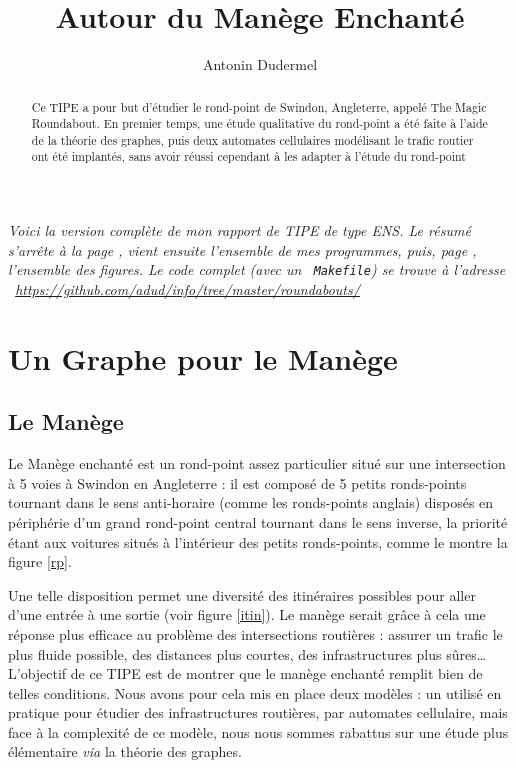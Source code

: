 \documentclass[11pt]{article}
\title{Autour du Manège Enchanté}
\date{}
\author{Antonin Dudermel}
\begin{document}

\maketitle

{\it \small
Voici la version complète de mon rapport de TIPE de type ENS.  Le résumé s'arrête à la page \pageref{finres}, vient ensuite l'ensemble de mes programmes, puis, page \pageref{figs}, l'ensemble des figures. Le code complet (avec un ~\verb+Makefile+) se trouve à l'adresse ~\url{https://github.com/adud/info/tree/master/roundabouts/}}

\begin{abstract}
	Ce TIPE a pour but d'étudier le rond-point de Swindon, Angleterre, appelé The Magic Roundabout. En premier temps, une étude qualitative du rond-point a été faite à l'aide de la théorie des graphes, puis deux automates cellulaires modélisant le trafic routier ont été implantés, sans avoir réussi cependant à les adapter à l'étude du rond-point

\end{abstract}

\section{Un Graphe pour le Manège}
	\subsection{Le Manège}
	
Le Manège enchanté est un rond-point assez particulier situé sur une intersection à 5 voies à Swindon en Angleterre : il est composé de 5 petits ronds-points tournant dans le sens anti-horaire (comme les ronds-points anglais) disposés en périphérie d'un grand rond-point central tournant dans le sens inverse, la priorité étant aux voitures situés à l'intérieur des petits ronds-points, comme le montre la figure \ref{rp}.

Une telle disposition permet une diversité des itinéraires possibles pour aller d'une entrée à une sortie (voir figure \ref{itin}). Le manège serait grâce à cela une réponse plus efficace au problème des intersections routières : assurer un trafic le plus fluide possible, des distances plus courtes, des infrastructures plus sûres… L'objectif de ce TIPE est de montrer que le manège enchanté remplit bien de telles conditions. Nous avons pour cela mis en place deux modèles : un utilisé en pratique pour étudier des infrastructures routières, par automates cellulaire, mais face à la complexité de ce modèle, nous nous sommes rabattus sur une étude plus élémentaire {\it via} la théorie des graphes.
\end{document}
